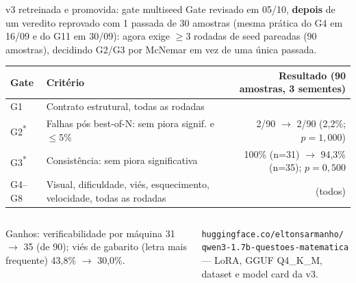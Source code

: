 \documentclass[aspectratio=169,11pt]{beamer}
\newcommand{\okmark}{{\color{okgreen}\faCheckCircle}}
\begin{document}
\begin{frame}{v3 retreinada e promovida: gate multiseed}
  \footnotesize
  Gate revisado em 05/10, \textbf{depois} de um veredito reprovado com 1 passada de 30 amostras (mesma prática do G4 em 16/09 e do G11 em 30/09): agora exige $\ge$3 rodadas de seed pareadas (90 amostras), decidindo G2/G3 por McNemar em vez de uma única passada.

  \vspace{3pt}
  \begin{tabularx}{\textwidth}{@{}l X r@{}}
    \toprule
    \textbf{Gate} & \textbf{Critério} & \textbf{Resultado (90 amostras, 3 sementes)} \\
    \midrule
    G1       & Contrato estrutural, todas as rodadas                 & \okmark \\
    G2\textsuperscript{*} & Falhas pós best-of-N: sem piora signif. e $\le$5\%     & 2/90 $\to$ 2/90 (2,2\%; $p=1{,}000$) \okmark \\
    G3\textsuperscript{*} & Consistência: sem piora significativa                  & 100\% (n=31) $\to$ 94,3\% (n=35); $p=0{,}500$ \okmark \\
    G4--G8   & Visual, dificuldade, viés, esquecimento, velocidade, todas as rodadas & \okmark (todos) \\
    \bottomrule
  \end{tabularx}

  \vspace{6pt}
  \begin{columns}[T]
    \begin{tcolorbox}[colback=lightgreen, colframe=okgreen, boxrule=0.5pt, arc=2pt, title={\scriptsize Decisão: PROMOVIDO}, fonttitle=\bfseries, coltitle=white, colbacktitle=okgreen, left=4pt, right=4pt, top=2pt, bottom=2pt]
      \scriptsize Ganhos: verificabilidade por máquina 31 $\to$ 35 (de 90); viés de gabarito (letra mais frequente) 43,8\% $\to$ 30,0\%.
    \end{tcolorbox}
    \begin{tcolorbox}[colback=lightblue, colframe=accentblue, boxrule=0.5pt, arc=2pt, title={\scriptsize Publicado}, fonttitle=\bfseries, coltitle=white, colbacktitle=accentblue, left=4pt, right=4pt, top=2pt, bottom=2pt]
      \scriptsize \texttt{huggingface.co/eltonsarmanho/}\\\texttt{qwen3-1.7b-questoes-matematica} --- LoRA, GGUF Q4\_K\_M, dataset e model card da v3.
    \end{tcolorbox}
  \end{columns}
\end{frame}
\end{document}
